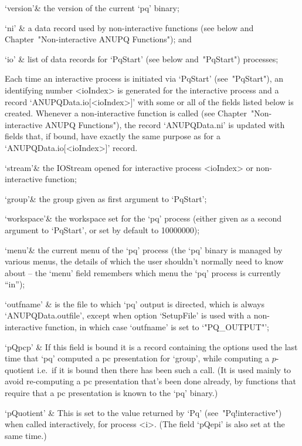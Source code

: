 \quad`version'& the version of the current `pq' binary;

\quad`ni' & a data record used by non-interactive  functions  (see  below
and Chapter~"Non-interactive ANUPQ Functions"); and

\quad`io' & list of data records for `PqStart' (see below  and~"PqStart")
processes;

\enditems

Each time an interactive {\ANUPQ}  process  is  initiated  via  `PqStart'
(see~"PqStart"), an identifying number <ioIndex>  is  generated  for  the
interactive process and a record `ANUPQData.io[<ioIndex>]' with  some  or
all of the fields listed below is  created.  Whenever  a  non-interactive
function is called (see Chapter~"Non-interactive ANUPQ  Functions"),  the
record `ANUPQData.ni' is updated with fields that, if bound, have exactly
the same purpose as for a `ANUPQData.io[<ioIndex>]' record.

\beginitems

\quad`stream'& the  IOStream  opened  for  interactive  {\ANUPQ}  process
<ioIndex> or non-interactive {\ANUPQ} function;

\quad`group'& the group given as first argument to `PqStart';

\quad`workspace'& the workspace set for the `pq' process (either given as
a second argument to `PqStart', or set by default to 10000000);

\quad`menu'& the current menu of the `pq' process  (the  `pq'  binary  is
managed by various  menus,  the  details  of  which  the  user  shouldn't
normally need to know about -- the `menu' field remembers which menu  the
`pq' process is currently ``in'');

\quad`outfname' & is the file to which `pq' output is directed, which  is
always `ANUPQData.outfile', except when option `SetupFile' is used with a
non-interactive  function,  in  which   case   `outfname'   is   set   to
`"PQ_OUTPUT"';

\quad`pQpcp' & If this field is bound  it  is  a  record  containing  the
options used the last time that  `pq'  computed  a  pc  presentation  for
`group', while computing a $p$-quotient i.e.~if it is  bound  then  there
has been such a call. (It is used  mainly  to  avoid  re-computing  a  pc
presentation that's been done already, by functions that require  that  a
pc presentation is known to the `pq' binary.)

\quad`pQuotient'  &  This  is  set  to  the  value   returned   by   `Pq'
(see~"Pq!interactive") when called interactively, for process  <i>.  (The
field `pQepi' is also set at the same time.)

